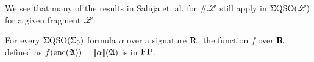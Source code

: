 

%

We see that many of the results in Saluja et. al. \cite{DBLP:journals/jcss/SalujaST95} for $\#\mathscr{L}$ still apply in $\Sigma{\rm QSO}(\mathscr{L})$ for a given fragment $\mathscr{L}$:

\begin{theorem} \label{eqso-sigma-zero-in-fp}
	For every $\Sigma{\rm QSO}(\Sigma_{0})$ formula $\alpha$ over a signature $\mathbf{R}$, the function $f$ over $\mathbf{R}$ defined as $f({\rm enc}(\mathfrak{A})) = {\llbracket{}{\alpha}\rrbracket}(\mathfrak{A})$ is in $\text{\sc FP}$.
\end{theorem}

